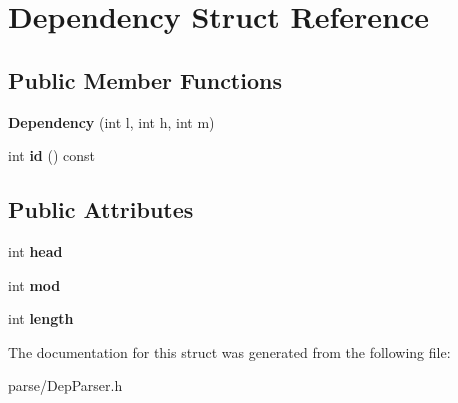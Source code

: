 \hypertarget{structDependency}{
\section{Dependency Struct Reference}
\label{structDependency}
}
\subsection*{Public Member Functions}
\begin{DoxyCompactItemize}
\item 
\hypertarget{structDependency_a92ebdf715c4c81e556bc274f86027400}{
{\bfseries Dependency} (int l, int h, int m)}
\label{structDependency_a92ebdf715c4c81e556bc274f86027400}

\item 
\hypertarget{structDependency_a38ba361a116c72f4e41298b6320a6540}{
int {\bfseries id} () const }
\label{structDependency_a38ba361a116c72f4e41298b6320a6540}

\end{DoxyCompactItemize}
\subsection*{Public Attributes}
\begin{DoxyCompactItemize}
\item 
\hypertarget{structDependency_ae50c91ea1c7f2a16a29e7ecf9cf0a6ba}{
int {\bfseries head}}
\label{structDependency_ae50c91ea1c7f2a16a29e7ecf9cf0a6ba}

\item 
\hypertarget{structDependency_a45e806cfc00a3bcce4d5ebaab52c1f77}{
int {\bfseries mod}}
\label{structDependency_a45e806cfc00a3bcce4d5ebaab52c1f77}

\item 
\hypertarget{structDependency_a95f049533781d9ae8fea8f447e4739fe}{
int {\bfseries length}}
\label{structDependency_a95f049533781d9ae8fea8f447e4739fe}

\end{DoxyCompactItemize}


The documentation for this struct was generated from the following file:\begin{DoxyCompactItemize}
\item 
parse/DepParser.h\end{DoxyCompactItemize}
